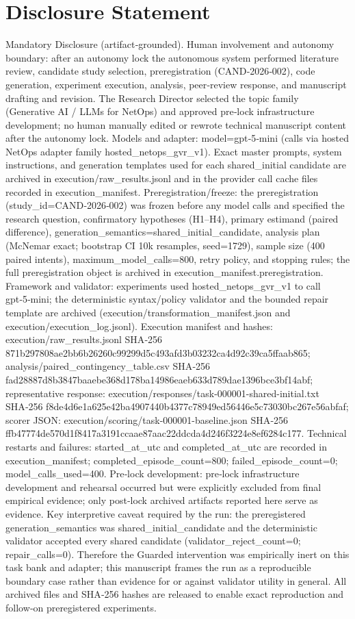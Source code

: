 \documentclass[conference]{IEEEtran}
\begin{document}
\section*{Disclosure Statement}
Mandatory Disclosure (artifact‑grounded). Human involvement and autonomy boundary: after an autonomy lock the autonomous system performed literature review, candidate study selection, preregistration (CAND‑2026‑002), code generation, experiment execution, analysis, peer‑review response, and manuscript drafting and revision. The Research Director selected the topic family (Generative AI / LLMs for NetOps) and approved pre‑lock infrastructure development; no human manually edited or rewrote technical manuscript content after the autonomy lock. Models and adapter: model=gpt‑5‑mini (calls via hosted NetOps adapter family hosted\_netops\_gvr\_v1). Exact master prompts, system instructions, and generation templates used for each shared\_initial candidate are archived in execution/raw\_results.jsonl and in the provider call cache files recorded in execution\_manifest. Preregistration/freeze: the preregistration (study\_id=CAND‑2026‑002) was frozen before any model calls and specified the research question, confirmatory hypotheses (H1--H4), primary estimand (paired difference), generation\_semantics=shared\_initial\_candidate, analysis plan (McNemar exact; bootstrap CI 10k resamples, seed=1729), sample size (400 paired intents), maximum\_model\_calls=800, retry policy, and stopping rules; the full preregistration object is archived in execution\_manifest.preregistration. Framework and validator: experiments used hosted\_netops\_gvr\_v1 to call gpt‑5‑mini; the deterministic syntax/policy validator and the bounded repair template are archived (execution/transformation\_manifest.json and execution/execution\_log.jsonl). Execution manifest and hashes: execution/raw\_results.jsonl SHA‑256 871b297808ae2bb6b26260c99299d5c493afd3b03232ca4d92c39ca5ffaab865; analysis/paired\_contingency\_table.csv SHA‑256 fad28887d8b3847baaebe368d178ba14986eaeb633d789dae1396bce3bf14abf; representative response: execution/responses/task-000001-shared-initial.txt SHA‑256 f8de4d6e1a625e42ba4907440b4377c78949ed56446e5c73030bc267e56abfaf; scorer JSON: execution/scoring/task-000001-baseline.json SHA‑256 ffb47774de570d1f8417a3191ccaae87aac22ddcda4d246f3224e8ef6284c177. Technical restarts and failures: started\_at\_utc and completed\_at\_utc are recorded in execution\_manifest; completed\_episode\_count=800; failed\_episode\_count=0; model\_calls\_used=400. Pre‑lock development: pre‑lock infrastructure development and rehearsal occurred but were explicitly excluded from final empirical evidence; only post‑lock archived artifacts reported here serve as evidence. Key interpretive caveat required by the run: the preregistered generation\_semantics was shared\_initial\_candidate and the deterministic validator accepted every shared candidate (validator\_reject\_count=0; repair\_calls=0). Therefore the Guarded intervention was empirically inert on this task bank and adapter; this manuscript frames the run as a reproducible boundary case rather than evidence for or against validator utility in general. All archived files and SHA‑256 hashes are released to enable exact reproduction and follow‑on preregistered experiments.
\end{document}
